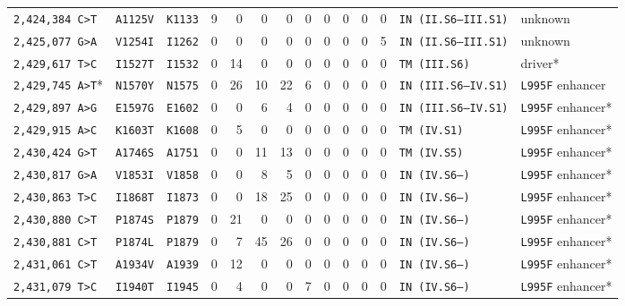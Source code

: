 \begin{tabular}{lllrrrrrrrrrll}
\texttt{2,424,384 C>T} & \texttt{A1125V} & \texttt{K1133} & 9 & 0 & 0 & 0 & 0 & 0 & 0 & 0 & 0 & \texttt{IN (II.S6--III.S1)} & unknown \\

\texttt{2,425,077 G>A} & \texttt{V1254I} & \texttt{I1262} & 0 & 0 & 0 & 0 & 0 & 0 & 0 & 0 & 5 & \texttt{IN (II.S6--III.S1)} & unknown \\

\texttt{2,429,617 T>C} & \texttt{I1527T} & \texttt{I1532} & 0 & 14 & 0 & 0 & 0 & 0 & 0 & 0 & 0 & \texttt{TM (III.S6)} & driver* \\

\texttt{2,429,745 A>T}* & \texttt{N1570Y} & \texttt{N1575} & 0 & 26 & 10 & 22 & 6 & 0 & 0 & 0 & 0 & \texttt{IN (III.S6--IV.S1)} & \texttt{L995F} enhancer \\

\texttt{2,429,897 A>G} & \texttt{E1597G} & \texttt{E1602} & 0 & 0 & 6 & 4 & 0 & 0 & 0 & 0 & 0 & \texttt{IN (III.S6--IV.S1)} & \texttt{L995F} enhancer* \\

\texttt{2,429,915 A>C} & \texttt{K1603T} & \texttt{K1608} & 0 & 5 & 0 & 0 & 0 & 0 & 0 & 0 & 0 & \texttt{TM (IV.S1)} & \texttt{L995F} enhancer* \\

\texttt{2,430,424 G>T} & \texttt{A1746S} & \texttt{A1751} & 0 & 0 & 11 & 13 & 0 & 0 & 0 & 0 & 0 & \texttt{TM (IV.S5)} & \texttt{L995F} enhancer* \\

\texttt{2,430,817 G>A} & \texttt{V1853I} & \texttt{V1858} & 0 & 0 & 8 & 5 & 0 & 0 & 0 & 0 & 0 & \texttt{IN (IV.S6--)} & \texttt{L995F} enhancer* \\

\texttt{2,430,863 T>C} & \texttt{I1868T} & \texttt{I1873} & 0 & 0 & 18 & 25 & 0 & 0 & 0 & 0 & 0 & \texttt{IN (IV.S6--)} & \texttt{L995F} enhancer* \\

\texttt{2,430,880 C>T} & \texttt{P1874S} & \texttt{P1879} & 0 & 21 & 0 & 0 & 0 & 0 & 0 & 0 & 0 & \texttt{IN (IV.S6--)} & \texttt{L995F} enhancer* \\

\texttt{2,430,881 C>T} & \texttt{P1874L} & \texttt{P1879} & 0 & 7 & 45 & 26 & 0 & 0 & 0 & 0 & 0 & \texttt{IN (IV.S6--)} & \texttt{L995F} enhancer* \\

\texttt{2,431,061 C>T} & \texttt{A1934V} & \texttt{A1939} & 0 & 12 & 0 & 0 & 0 & 0 & 0 & 0 & 0 & \texttt{IN (IV.S6--)} & \texttt{L995F} enhancer* \\

\texttt{2,431,079 T>C} & \texttt{I1940T} & \texttt{I1945} & 0 & 4 & 0 & 0 & 7 & 0 & 0 & 0 & 0 & \texttt{IN (IV.S6--)} & \texttt{L995F} enhancer* \\

\bottomrule
\end{tabular}
